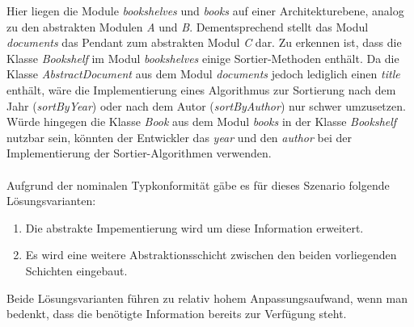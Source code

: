 \documentclass[11pt, 
ngerman,
doublespacing,
chapterinoneline, %
consistentlayout, %
]{scrartcl}
\begin{document}
Hier liegen die Module \emph{bookshelves} und \emph{books} auf einer Architekturebene, analog zu den abstrakten Modulen \emph{A} und \emph{B}. Dementsprechend stellt das Modul \emph{documents} das Pendant zum abstrakten Modul \emph{C} dar. Zu erkennen ist, dass die Klasse \emph{Bookshelf} im Modul \emph{bookshelves} einige Sortier-Methoden enthält. Da die Klasse \emph{AbstractDocument} aus dem Modul \emph{documents} jedoch lediglich einen \emph{title} enthält, wäre die Implementierung eines Algorithmus zur Sortierung nach dem Jahr (\emph{sortByYear}) oder nach dem Autor (\emph{sortByAuthor}) nur schwer umzusetzen. Würde hingegen die Klasse \emph{Book} aus dem Modul \emph{books} in der Klasse \emph{Bookshelf} nutzbar sein, könnten der Entwickler das \emph{year} und den \emph{author} bei der Implementierung der Sortier-Algorithmen verwenden.\\\\
Aufgrund der nominalen Typkonformität gäbe es für dieses Szenario folgende Lösungsvarianten:
\begin{enumerate}
\item Die abstrakte Impementierung wird um diese Information erweitert.
\item Es wird eine weitere Abstraktionsschicht zwischen den beiden vorliegenden Schichten eingebaut.
\end{enumerate}
Beide Lösungsvarianten führen zu relativ hohem Anpassungsaufwand, wenn man bedenkt, dass die benötigte Information bereits zur Verfügung steht.
\end{document}
